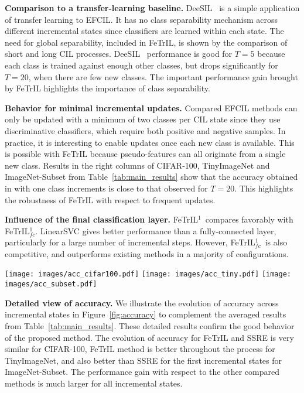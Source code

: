\documentclass[10pt,twocolumn,letterpaper]{article}
\makeatletter
\newcommand{\ourmodel}{FeTrIL\@\xspace}
\newcommand{\ourmodelone}{FeTrIL$^1$~}
\newcommand{\ourmodeloneFcNospace}{FeTrIL$^1_{fc}$}
\newcommand{\ourmodeloneFc}{FeTrIL$^1_{fc}$~}
\makeatother
\begin{document}
\textbf{Comparison to a transfer-learning baseline.} DeeSIL~\cite{belouadah2018_deesil} is a simple application of transfer learning to EFCIL.
It has no class separability mechanism across different incremental states since classifiers are learned within each state. 
The need for global separability, included in \ourmodel, is shown by the comparison of short and long CIL processes.
DeeSIL~\cite{belouadah2018_deesil} performance is good for $T=5$ because each class is trained against enough other classes, but drops significantly for $T=20$, when there are few new classes.
The important performance gain brought by \ourmodel highlights the importance of class separability. 

\textbf{Behavior for minimal incremental updates.}
Compared EFCIL methods can only be updated with a minimum of two classes per CIL state since they use discriminative classifiers, which require both positive and negative samples.
In practice, it is interesting to enable updates once each new class is available.
This is possible with \ourmodel because pseudo-features can all originate from a single new class.
Results in the right columns of CIFAR-100, TinyImageNet and ImageNet-Subset from Table~\ref{tab:main_results} show that the accuracy obtained in with one class increments is close to that observed for $T=20$. 
This highlights the robustness of \ourmodel with respect to frequent updates. 



\textbf{Influence of the final classification layer.} 
\ourmodelone compares favorably with \ourmodeloneFcNospace.
LinearSVC gives better performance than a fully-connected layer, particularly for a large number of incremental steps. 
However, \ourmodeloneFc is also competitive, and outperforms existing methods in a majority of configurations.

\begin{figure*}
\centering
    {{\texttt{[image: images/acc\_cifar100.pdf]} }}{{\texttt{[image: images/acc\_tiny.pdf]} }}{{\texttt{[image: images/acc\_subset.pdf]} }}\caption{Evolution of top-1 accuracy for an incremental process with $T=10$ IL states. \textit{Best viewed in color.} }
\label{fig:accuracy}
\vspace{-2mm}
\end{figure*}

\textbf{Detailed view of accuracy.} We illustrate the evolution of accuracy across incremental states in Figure~\ref{fig:accuracy} to complement the averaged results from Table~\ref{tab:main_results}. 
These detailed results confirm the good behavior of the proposed method.
The evolution of accuracy for \ourmodel and SSRE is very similar for CIFAR-100, \ourmodel method is better throughout the process for TinyImageNet, and also better than SSRE for the first incremental states for ImageNet-Subset. 
The performance gain with respect to the other compared methods is much larger for all incremental states. 
\end{document}
